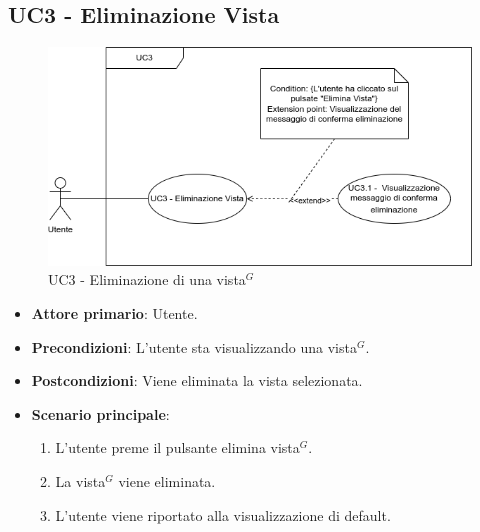 

\subsection{UC3 - Eliminazione Vista}
\label{sec:UC3}
\begin{figure}[h!]
    \centering
    \includegraphics[scale=0.60]{../../assets/eliminazione_vista.png}
    \caption{UC3 - Eliminazione di una vista$^{G}$}
\end{figure}
\begin{itemize}
    \item \textbf{Attore primario}: Utente.
    \item \textbf{Precondizioni}: L'utente sta visualizzando una vista$^{G}$.
    \item \textbf{Postcondizioni}: Viene eliminata la vista selezionata.
    \item \textbf{Scenario principale}:
          \begin{enumerate}
              \item L'utente preme il pulsante elimina vista$^{G}$.
              \item La vista$^{G}$ viene eliminata.
              \item L'utente viene riportato alla visualizzazione di default.
          \end{enumerate}
\end{itemize}

